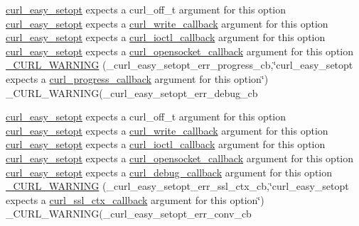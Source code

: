 \begin{DoxyCompactItemize}
\item 
\hyperlink{easy_8h_a7b171739b7bb728b3b58b2e6ec454aa0}{curl\+\_\+easy\+\_\+setopt} expects a curl\+\_\+off\+\_\+t argument for this option \hyperlink{easy_8h_a7b171739b7bb728b3b58b2e6ec454aa0}{curl\+\_\+easy\+\_\+setopt} expects a \hyperlink{curl_8h_ad65e62dcde45b356254b0f25f38dd802}{curl\+\_\+write\+\_\+callback} argument for this option \hyperlink{easy_8h_a7b171739b7bb728b3b58b2e6ec454aa0}{curl\+\_\+easy\+\_\+setopt} expects a \hyperlink{curl_8h_ae0524f6ec082005e39eb275c71c59a3b}{curl\+\_\+ioctl\+\_\+callback} argument for this option \hyperlink{easy_8h_a7b171739b7bb728b3b58b2e6ec454aa0}{curl\+\_\+easy\+\_\+setopt} expects a \hyperlink{curl_8h_a1b8b8f3e1a4e538a6bb1dd83a3388547}{curl\+\_\+opensocket\+\_\+callback} argument for this option \hyperlink{typecheck-gcc_8h_aef8013d9624220baa0e35e9aea995039}{\+\_\+\+C\+U\+R\+L\+\_\+\+W\+A\+R\+N\+I\+N\+G} (\+\_\+curl\+\_\+easy\+\_\+setopt\+\_\+err\+\_\+progress\+\_\+cb,\char`\"{}curl\+\_\+easy\+\_\+setopt expects a \hyperlink{curl_8h_af0a8c6d62890980b259658d6a4b5454a}{curl\+\_\+progress\+\_\+callback} argument for this option\char`\"{}) \+\_\+\+C\+U\+R\+L\+\_\+\+W\+A\+R\+N\+I\+N\+G(\+\_\+curl\+\_\+easy\+\_\+setopt\+\_\+err\+\_\+debug\+\_\+cb
\item 
\hyperlink{easy_8h_a7b171739b7bb728b3b58b2e6ec454aa0}{curl\+\_\+easy\+\_\+setopt} expects a curl\+\_\+off\+\_\+t argument for this option \hyperlink{easy_8h_a7b171739b7bb728b3b58b2e6ec454aa0}{curl\+\_\+easy\+\_\+setopt} expects a \hyperlink{curl_8h_ad65e62dcde45b356254b0f25f38dd802}{curl\+\_\+write\+\_\+callback} argument for this option \hyperlink{easy_8h_a7b171739b7bb728b3b58b2e6ec454aa0}{curl\+\_\+easy\+\_\+setopt} expects a \hyperlink{curl_8h_ae0524f6ec082005e39eb275c71c59a3b}{curl\+\_\+ioctl\+\_\+callback} argument for this option \hyperlink{easy_8h_a7b171739b7bb728b3b58b2e6ec454aa0}{curl\+\_\+easy\+\_\+setopt} expects a \hyperlink{curl_8h_a1b8b8f3e1a4e538a6bb1dd83a3388547}{curl\+\_\+opensocket\+\_\+callback} argument for this option \hyperlink{easy_8h_a7b171739b7bb728b3b58b2e6ec454aa0}{curl\+\_\+easy\+\_\+setopt} expects a \hyperlink{curl_8h_a50147c55283ee1fa3322b0d5aff2326c}{curl\+\_\+debug\+\_\+callback} argument for this option \hyperlink{typecheck-gcc_8h_a1edc9e69bef3da2b6c4f152a691a86fb}{\+\_\+\+C\+U\+R\+L\+\_\+\+W\+A\+R\+N\+I\+N\+G} (\+\_\+curl\+\_\+easy\+\_\+setopt\+\_\+err\+\_\+ssl\+\_\+ctx\+\_\+cb,\char`\"{}curl\+\_\+easy\+\_\+setopt expects a \hyperlink{curl_8h_a9b5a1cf0ff518b80be52ff24bdea5d8a}{curl\+\_\+ssl\+\_\+ctx\+\_\+callback} argument for this option\char`\"{}) \+\_\+\+C\+U\+R\+L\+\_\+\+W\+A\+R\+N\+I\+N\+G(\+\_\+curl\+\_\+easy\+\_\+setopt\+\_\+err\+\_\+conv\+\_\+cb

\end{DoxyCompactItemize}
